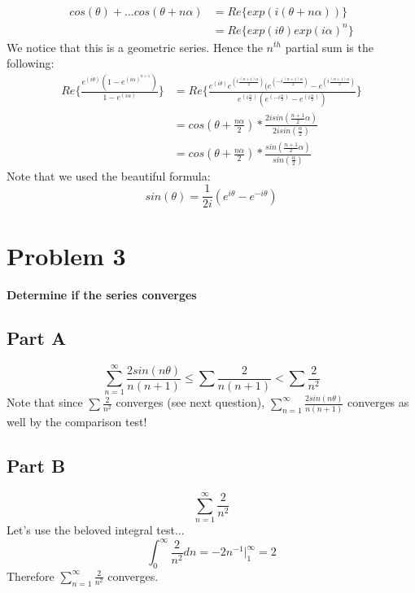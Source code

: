 \documentclass[10pt,a4paper]{article}
\begin{document}
	\begin{equation}
	\nonumber
		\begin{split}
			cos(\theta)+ \dots cos(\theta+n\alpha) &= Re\{exp(i(\theta+n\alpha))\}\\
			&= Re\{exp(i\theta)exp(i\alpha)^{n}\}
		\end{split}
	\end{equation}
	We notice that this is a geometric series. Hence the $n^{th}$ partial sum is the following:
	\begin{equation}
	\nonumber
		\begin{split}
		Re\Big\{ \frac{e^{(i\theta)}(1-e^{(i\alpha)^{n+1}})}{1-e^{(i\alpha)}} \Big\} &= Re\Big\{ \frac{e^{(i\theta)}e^{(i\frac{(n+1)\alpha }{2})}(e^{(-i\frac{(n+1)\alpha }{2})}-e^{(i\frac{(n+1)\alpha }{2})}}{e^{(i\frac{\alpha }{2})}(e^{(-i\frac{\alpha }{2})}-e^{(i\frac{\alpha }{2})})} \Big\}\\
		& = cos(\theta+\frac{n\alpha}{2})*\frac{2isin(\frac{n+1}{2}\alpha)}{2isin(\frac{\alpha}{2})}\\
		&= cos(\theta+\frac{n\alpha}{2})*\frac{sin(\frac{n+1}{2}\alpha)}{sin(\frac{\alpha}{2})}
		\end{split}
	\end{equation}
	Note that we used the beautiful formula:
	$$sin(\theta) = \frac{1}{2i}(e^{i\theta}-e^{-i\theta}) $$
	
	
	\newpage
	\section{Problem 3}
	\textbf{Determine if the series converges}
	\subsection{Part A}
	\begin{equation}
	\nonumber
		\sum_{n=1}^\infty \frac{2sin(n\theta)}{n(n+1)} \leq \sum \frac{2}{n(n+1)} < \sum \frac{2}{n^2}
	\end{equation}
	Note that since $\sum \frac{2}{n^2}$ converges (see next question), $\sum_{n=1}^\infty \frac{2sin(n\theta)}{n(n+1)}$ converges as well by the comparison test!
	\subsection{Part B}
	\begin{equation}
	\nonumber
	\sum_{n=1}^\infty \frac{2}{n^2} 
	\end{equation}
	Let's use the beloved integral test...
	$$\int_{0}^\infty \frac{2}{n^2}dn = -2n^{-1}\Big|^\infty_1= 2 $$
	Therefore $\sum_{n=1}^\infty \frac{2}{n^2} $ converges.
	
\end{document}
